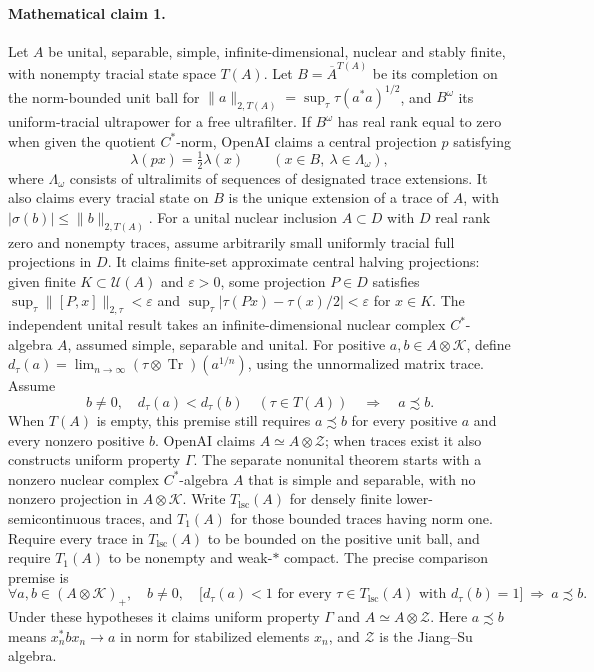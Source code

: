 \documentclass[11pt]{article}
\begin{document}
\paragraph{Mathematical claim 1.} Let $A$ be unital, separable, simple, infinite-dimensional, nuclear and stably finite, with nonempty tracial state space $T(A)$. Let $B=\overline A^{T(A)}$ be its completion on the norm-bounded unit ball for $\|a\|_{2,T(A)}=\sup_\tau\tau(a^*a)^{1/2}$, and $B^\omega$ its uniform-tracial ultrapower for a free ultrafilter. If $B^\omega$ has real rank equal to zero when given the quotient $C^*$-norm, OpenAI claims a central projection $p$ satisfying
\[
\lambda(px)=\tfrac12\lambda(x)\qquad(x\in B,\ \lambda\in\Lambda_\omega),
\]
where $\Lambda_\omega$ consists of ultralimits of sequences of designated trace extensions. It also claims every tracial state on $B$ is the unique extension of a trace of $A$, with $|\sigma(b)|\le\|b\|_{2,T(A)}$.
For a unital nuclear inclusion $A\subset D$ with $D$ real rank zero and nonempty traces, assume arbitrarily small uniformly tracial full projections in $D$. It claims finite-set approximate central halving projections: given finite $K\subset\mathcal U(A)$ and $\varepsilon>0$, some projection $P\in D$ satisfies $\sup_\tau\|[P,x]\|_{2,\tau}<\varepsilon$ and $\sup_\tau|\tau(Px)-\tau(x)/2|<\varepsilon$ for $x\in K$.
The independent unital result takes an infinite-dimensional nuclear complex $C^*$-algebra $A$, assumed simple, separable and unital. For positive $a,b\in A\otimes\mathcal K$, define $d_\tau(a)=\lim_{n\to\infty}(\tau\otimes\operatorname{Tr})(a^{1/n})$, using the unnormalized matrix trace. Assume
\[
b\ne0,\quad d_\tau(a)<d_\tau(b)\quad(\tau\in T(A))\quad\Longrightarrow\quad a\precsim b.
\]
When $T(A)$ is empty, this premise still requires $a\precsim b$ for every positive $a$ and every nonzero positive $b$. OpenAI claims $A\simeq A\otimes\mathcal Z$; when traces exist it also constructs uniform property $\Gamma$.
The separate nonunital theorem starts with a nonzero nuclear complex $C^*$-algebra $A$ that is simple and separable, with no nonzero projection in $A\otimes\mathcal K$. Write $T_{\mathrm{lsc}}(A)$ for densely finite lower-semicontinuous traces, and $T_1(A)$ for those bounded traces having norm one. Require every trace in $T_{\mathrm{lsc}}(A)$ to be bounded on the positive unit ball, and require $T_1(A)$ to be nonempty and weak-$*$ compact. The precise comparison premise is
\[
\forall a,b\in(A\otimes\mathcal K)_+,\quad b\ne0,\quad
\bigl[d_\tau(a)<1\text{ for every }\tau\in T_{\mathrm{lsc}}(A)\text{ with }d_\tau(b)=1\bigr]
\ \Longrightarrow\ a\precsim b.
\]
Under these hypotheses it claims uniform property $\Gamma$ and $A\simeq A\otimes\mathcal Z$. Here $a\precsim b$ means $x_n^*bx_n\to a$ in norm for stabilized elements $x_n$, and $\mathcal Z$ is the Jiang--Su algebra.
\end{document}
